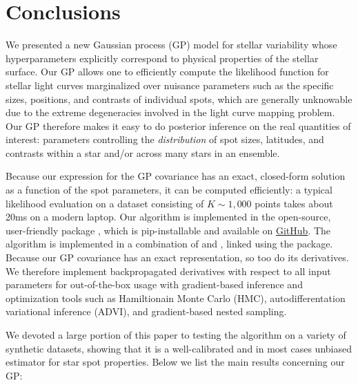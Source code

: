 \documentclass[modern]{aastex62}
\begin{document}
\section{Conclusions}
\label{sec:conclusions}
We presented a new Gaussian process (GP) model for stellar variability
whose hyperparameters explicitly correspond to physical properties of the stellar
surface. Our GP allows one to efficiently compute the likelihood function
for stellar light curves
marginalized over nuisance parameters such as the specific sizes,
positions, and contrasts of individual spots,
which are generally unknowable due to the extreme degeneracies
involved in the light curve mapping problem. Our GP therefore
makes it easy to
do posterior inference on the real quantities of interest: parameters
controlling the \emph{distribution} of spot sizes, latitudes, and
contrasts within a star and/or across many stars in an ensemble.

Because our expression for the GP covariance has an exact, closed-form
solution as a function of the spot parameters, it can be computed
efficiently: a typical likelihood evaluation on a dataset
consisting of $K \sim 1{,}000$ points takes about 20ms on a modern
laptop. Our algorithm is implemented in the open-source, user-friendly
\Python package \starryprocess, which is \textsf{pip}-installable and available on
\href{https://github.com/rodluger/starry_process}{GitHub}.
The algorithm is implemented in a combination of \cpp and \Python,
linked using the \theano package. Because our GP covariance has an exact
representation, so too do its derivatives. We therefore implement
backpropagated derivatives with respect to all input parameters for
out-of-the-box usage with gradient-based inference and optimization
tools such as Hamiltionain Monte Carlo (HMC), autodifferentation
variational inference (ADVI), and gradient-based nested sampling.

We devoted a large portion of this paper to testing the algorithm on a variety
of synthetic datasets, showing that it is a well-calibrated and in most
cases unbiased estimator for star spot properties. Below we list the main
results concerning our GP:
\end{document}
